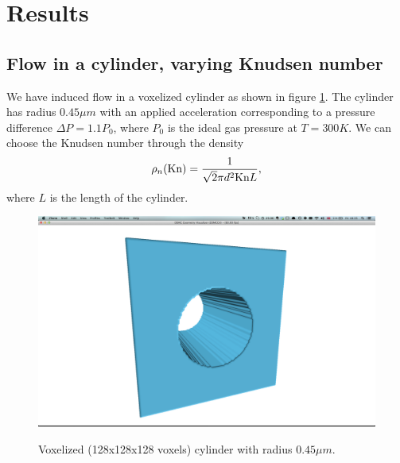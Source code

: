 \section{Results}
\subsection{Flow in a cylinder, varying Knudsen number}
We have induced flow in a voxelized cylinder as shown in figure \ref{fig:cylinder_flow}. The cylinder has radius $0.45 \mu m$ with an applied acceleration corresponding to a pressure difference $\Delta P = 1.1P_0$, where $P_0$ is the ideal gas pressure at $T=300K$. We can choose the Knudsen number through the density
\begin{align}
	\rho_n(\text{Kn}) = {1\over \sqrt 2 \pi d^2 \text{Kn}L},
\end{align}
where $L$ is the length of the cylinder. 

\begin{figure}[h]
\begin{center}
\includegraphics[width=\textwidth, trim=0cm 0cm 0cm 0cm, clip]{DSMC/figures/cylinder.png}
\label{fig:cylinder_flow}
\end{center}
\caption{Voxelized (128x128x128 voxels) cylinder with radius $0.45\mu m$.}
\end{figure}


